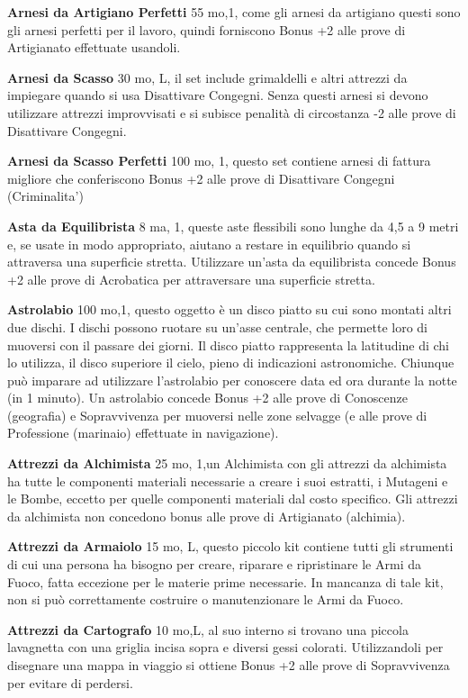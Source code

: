 \documentclass[a4paper,11pt,twoside,openany]{book}
\begin{document}
{\textbf{Arnesi da Artigiano Perfetti} 55 mo,1, come gli arnesi da artigiano questi sono gli arnesi perfetti per il lavoro, quindi forniscono Bonus +2 alle prove di Artigianato effettuate usandoli.

\textbf{Arnesi da Scasso} 30 mo, L, il set include grimaldelli e altri attrezzi da impiegare quando si usa Disattivare Congegni. Senza questi arnesi si devono utilizzare attrezzi improvvisati e si subisce penalità di circostanza -2 alle prove di Disattivare Congegni.

\textbf{Arnesi da Scasso Perfetti} 100 mo, 1, questo set contiene arnesi di fattura migliore che conferiscono Bonus +2 alle prove di Disattivare Congegni (Criminalita')

\textbf{Asta da Equilibrista} 8 ma, 1, queste aste flessibili sono lunghe da 4,5 a 9 metri e, se usate in modo appropriato, aiutano a restare in equilibrio quando si attraversa una superficie stretta. Utilizzare un'asta da equilibrista concede Bonus +2 alle prove di Acrobatica per attraversare una superficie stretta.

\textbf{Astrolabio} 100 mo,1,  questo oggetto è un disco piatto su cui sono montati altri due dischi. I dischi possono ruotare su un'asse centrale, che permette loro di muoversi con il passare dei giorni. Il disco piatto rappresenta la latitudine di chi lo utilizza, il disco superiore il cielo, pieno di indicazioni astronomiche.
Chiunque può imparare ad utilizzare l'astrolabio per conoscere data ed ora durante la notte (in 1 minuto). Un astrolabio concede Bonus +2 alle prove di Conoscenze (geografia) e Sopravvivenza per muoversi nelle zone selvagge (e alle prove di Professione (marinaio) effettuate in navigazione).

\textbf{Attrezzi da Alchimista} 25 mo, 1,un Alchimista con gli attrezzi da alchimista ha tutte le componenti materiali necessarie a creare i suoi estratti, i Mutageni e le Bombe, eccetto per quelle componenti materiali dal costo specifico. Gli attrezzi da alchimista non concedono bonus alle prove di Artigianato (alchimia).

\textbf{Attrezzi da Armaiolo} 15 mo, L, questo piccolo kit contiene tutti gli strumenti di cui una persona ha bisogno per creare, riparare e ripristinare le Armi da Fuoco, fatta eccezione per le materie prime necessarie. In mancanza di tale kit, non si può correttamente costruire o manutenzionare le Armi da Fuoco.

\textbf{Attrezzi da Cartografo} 10 mo,L, al suo interno si trovano una piccola lavagnetta con una griglia incisa sopra e diversi gessi colorati. Utilizzandoli per disegnare una mappa in viaggio si ottiene Bonus +2 alle prove di Sopravvivenza per evitare di perdersi.

}
\end{document}
